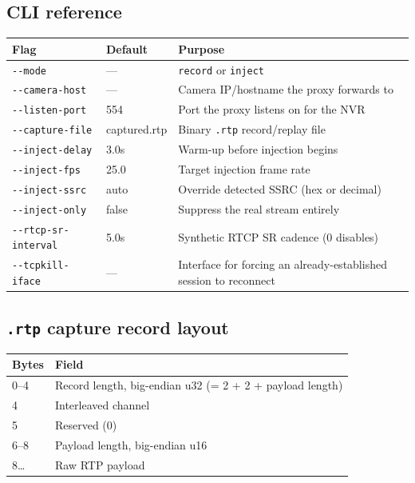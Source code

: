 \documentclass[11pt,a4paper]{article}
\newcommand{\code}[1]{\texttt{\small #1}}
\begin{document}
\subsection{CLI reference}
\begin{center}
\small
\begin{tabular}{@{}lll@{}}
\toprule
\textbf{Flag} & \textbf{Default} & \textbf{Purpose} \\
\midrule
\code{-{}-mode}             & ---           & \code{record} or \code{inject} \\
\code{-{}-camera-host}      & ---           & Camera IP/hostname the proxy forwards to \\
\code{-{}-listen-port}      & 554           & Port the proxy listens on for the NVR \\
\code{-{}-capture-file}     & captured.rtp  & Binary \code{.rtp} record/replay file \\
\code{-{}-inject-delay}     & 3.0s          & Warm-up before injection begins \\
\code{-{}-inject-fps}       & 25.0          & Target injection frame rate \\
\code{-{}-inject-ssrc}      & auto          & Override detected SSRC (hex or decimal) \\
\code{-{}-inject-only}      & false         & Suppress the real stream entirely \\
\code{-{}-rtcp-sr-interval} & 5.0s          & Synthetic RTCP SR cadence (0 disables) \\
\code{-{}-tcpkill-iface}    & ---           & Interface for forcing an already-established session to reconnect \\
\bottomrule
\end{tabular}
\end{center}

\subsection{\code{.rtp} capture record layout}
\begin{center}
\small
\begin{tabular}{@{}ll@{}}
\toprule
\textbf{Bytes} & \textbf{Field} \\
\midrule
0--4   & Record length, big-endian u32 (= 2 + 2 + payload length) \\
4      & Interleaved channel \\
5      & Reserved (0) \\
6--8   & Payload length, big-endian u16 \\
8\dots & Raw RTP payload \\
\bottomrule
\end{tabular}
\end{center}
\end{document}
